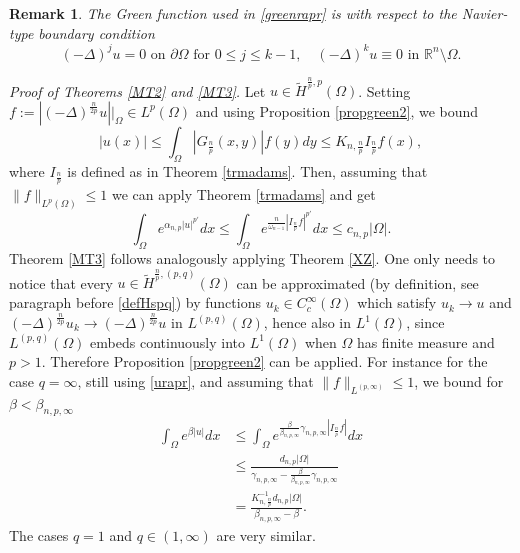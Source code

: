 \documentclass[11pt, a4paper]{article}
\newtheorem{lemma}[trm]{Lemma}
\newtheorem{rmk}[trm]{Remark}
\newcommand{\R}{\mathbb{R}}
\newcommand{\de}{\partial}
\newenvironment{proof}{\noindent\emph{Proof.}}{\phantom{ } \hfill$\square$\medskip}
\begin{document}
\begin{rmk}\label{navier} The Green function used in \eqref{greenrapr} is with respect to the Navier-type boundary condition
$$(-\Delta)^j u=0\text{ on } \de\Omega \text{ for }0\le j\le k-1,\quad (-\Delta)^ku\equiv 0\text{ in }\R^{n}\setminus \Omega. $$
\end{rmk}








\noindent \emph{Proof of Theorems \ref{MT2} and \ref{MT3}.} Let $u\in \tilde H^{\frac{n}{p},p}(\Omega)$.
Setting $f:=|(-\Delta)^\frac{n}{2p} u|\big|_{\Omega}\in L^p(\Omega)$ and using Proposition \ref{propgreen2}, we bound
\begin{equation}\label{urapr}
|u(x)| \le  \int_\Omega |G_\frac{n}{p}(x,y)|f(y)dy \le K_{n,\frac np}I_\frac{n}{p}f(x),
\end{equation}
where $I_{\frac np}$ is defined as in Theorem \ref{trmadams}.
Then, assuming that $\|f\|_{L^p(\Omega)}\le 1$ we can apply Theorem \ref{trmadams} and get
$$\int_\Omega e^{\alpha_{n,p}|u|^{p'}}dx\le \int_\Omega e^{\frac{n}{\omega_{n-1}}|I_\frac{n}{p}f|^{p'}}dx\le c_{n,p}|\Omega|.$$
Theorem \ref{MT3} follows analogously applying Theorem \ref{XZ}. One only needs to notice that every $u\in \tilde H^{\frac np,(p,q)}(\Omega)$ can be approximated (by definition, see paragraph before \eqref{defHspq}) by functions $u_k\in C^\infty_c(\Omega)$ which satisfy $u_k\to u$ and $(-\Delta)^\frac{n}{2p} u_k\to (-\Delta)^\frac{n}{2p}u$ in $L^{(p,q)}(\Omega)$, hence also in $L^1(\Omega)$, since $L^{(p,q)}(\Omega)$ embeds continuously into $L^1(\Omega)$ when $\Omega$ has finite measure and $p>1$. Therefore Proposition \ref{propgreen2} can be applied. %
For instance for the case $q=\infty$, still using \eqref{urapr}, and assuming that $\|f\|_{L^{(p,\infty)}}\le 1$, we bound for $\beta<\beta_{n,p,\infty}$
\[\begin{split}
\int_\Omega e^{\beta|u|}dx&\le\int_\Omega e^{\frac{\beta}{\beta_{n,p,\infty}}\gamma_{n,p,\infty} |I_\frac np f|}dx\\
&\le \frac{d_{n,p}|\Omega|}{\gamma_{n,p,\infty}-\frac{\beta}{\beta_{n,p,\infty}}\gamma_{n,p,\infty}}\\
&=\frac{K_{n,\frac{n}{p}}^{-1}d_{n,p}|\Omega|}{\beta_{n,p,\infty}-\beta}.
\end{split}\]
The cases $q=1$ and $q\in (1,\infty)$ are very similar.
\end{document}
